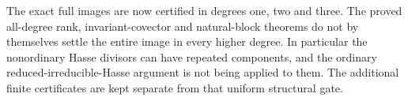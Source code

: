 \begin{remark}
The exact full images are now certified in degrees one, two and three.
The proved all-degree rank, invariant-covector and natural-block theorems
do not by themselves settle the entire image in every higher degree.
In particular the nonordinary Hasse divisors can have repeated components,
and the ordinary reduced-irreducible-Hasse argument is not being applied
to them. The additional finite certificates are kept separate from that
uniform structural gate.
\end{remark}
